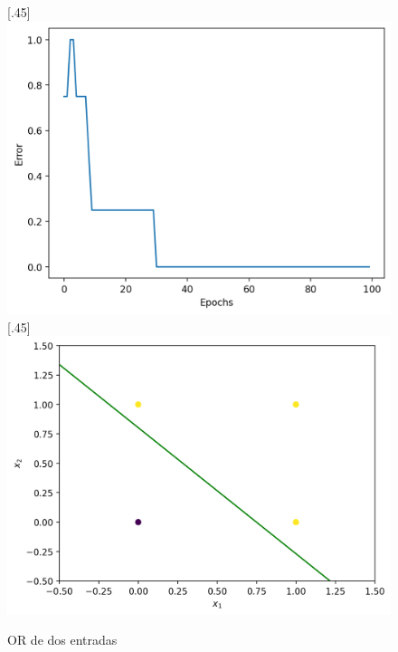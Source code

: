 \documentclass[12pt,a4paper]{article}
\begin{document}
\begin{figure}[H]
  [.45\linewidth]{
    \includegraphics[width=\linewidth]{img/3-training_error.png}
  }
  [.45\linewidth]{
    \includegraphics[width=\linewidth]{img/4-desicion_boundary.png}
  }
  \caption{OR de dos entradas}
  \centering
\end{figure}
\end{document}
